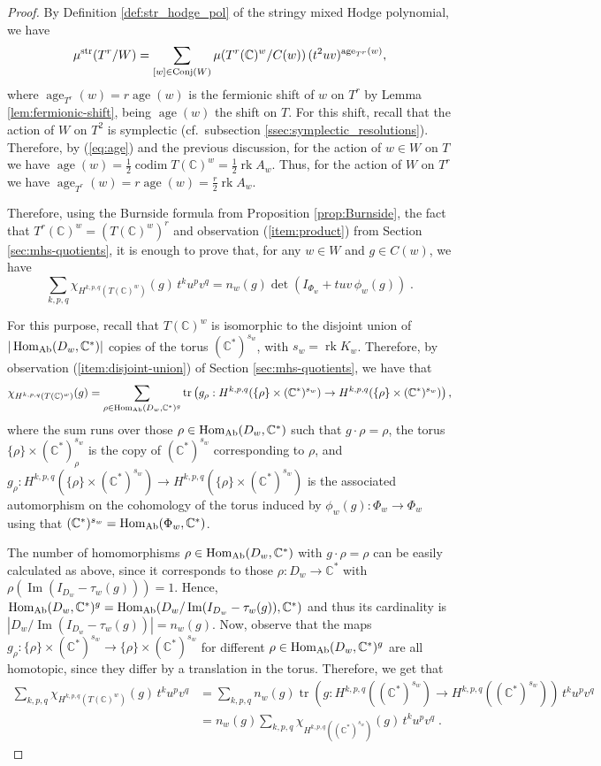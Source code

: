 \documentclass[11pt,english]{amsart}
\numberwithin{equation}{section}
\numberwithin{figure}{section}
\theoremstyle{plain}
\theoremstyle{plain}
\theoremstyle{definition}
\theoremstyle{remark}
\DeclareMathOperator{\image}{Im}
\newcommand{\CC}{\mathbb{C}}
\newcommand{\codim}{\operatorname{codim}}
\newcommand{\Hom}{\operatorname{Hom}}
\newcommand{\rk}{\operatorname{rk}}
\newcommand{\tr}{\operatorname{tr}}
\newcommand{\age}{\operatorname{age}}
\newcommand{\str}{\textup{str}}
\newcommand{\Ab}{\textup{Ab}}
\begin{document}
\begin{proof}
    By Definition \ref{def:str_hodge_pol} of the stringy mixed Hodge polynomial, we have
$$
    \mu^{\str}(T^r/W) = \sum_{[w] \in \text{Conj}(W)} \mu(T^r(\CC)^w / C(w))\, (t^{2}uv)^{\age_{T^r}(w)},
$$
where $\age_{T^r}(w) = r \age(w)$ is the fermionic shift of $w$ on $T^r$ by Lemma \ref{lem:fermionic-shift}, being $\age(w)$ the shift on $T$. For this shift, recall that the action of $W$ on $T^2$ is symplectic (cf.\ subsection \ref{ssec:symplectic_resolutions}). Therefore, by (\ref{eq:age}) and the previous discussion, for the action of $w \in W$ on $T$ we have $\age(w) = \frac{1}{2}\codim T(\CC)^w = \frac{1}{2}\rk A_w$. Thus, for the action of $W$ on $T^r$ we have $\age_{T^r}(w) = r \age(w) = \frac{r}{2}\rk A_w$.

Therefore, using the Burnside formula from Proposition \ref{prop:Burnside}, the fact that $T^r(\CC)^w = (T(\CC)^w)^r$ and observation (\ref{item:product}) from Section \ref{sec:mhs-quotients}, it is enough to prove that, for any $w \in W$ and $g \in C(w)$, we have
$$
    \sum_{k,p,q} \chi_{H^{k,p,q}(T(\CC)^w)}(g) \,t^ku^pv^q = n_{w}(g) \det\left(I_{\Phi_w} + tuv\,\phi_w(g)\right)\; .
$$

For this purpose, recall that $T(\CC)^w$ is isomorphic to the disjoint union of $|\Hom_{\Ab}(D_w, \CC^*)|$ copies of the torus $(\CC^*)^{s_w}$, with $s_w= \rk K_w$. Therefore, by observation (\ref{item:disjoint-union}) of Section \ref{sec:mhs-quotients}, we have that
$$
\chi_{H^{k,p,q}(T(\CC)^w)}(g) = \sum_{\rho \in \Hom_{\Ab}(D_w, \CC^*)^g} \tr\left(g_{\rho}: H^{k,p,q}(\{\rho\} \times (\CC^*)^{s_w}) \to H^{k,p,q}(\{\rho\} \times (\CC^*)^{s_w})\right),
$$
where the sum runs over those $\rho \in \Hom_{\Ab}(D_w, \CC^*)$ such that $g \cdot \rho = \rho$, the torus $\{\rho\} \times (\CC^*)^{s_w}_\rho$ is the copy of $(\CC^*)^{s_w}$ corresponding to $\rho$, and
$g_{\rho}: H^{k,p,q}(\{\rho\} \times (\CC^*)^{s_w})\to H^{k,p,q}(\{\rho\} \times (\CC^*)^{s_w})$ is the associated automorphism on the cohomology of the torus induced by $\phi_w(g): \Phi_w \to \Phi_w$ using that $(\CC^*)^{s_w} = \Hom_{\Ab}(\Phi_w, \CC^*)$.

The number of homomorphisms $\rho \in \Hom_{\Ab}(D_w, \CC^*)$ with $g \cdot \rho = \rho$ can be easily calculated as above, since it corresponds to those $\rho: D_w \to \CC^*$ with $\rho(\image(I_{D_w} - \tau_w(g))) = 1$. Hence, $\Hom_{\Ab}(D_w, \CC^*)^g = \Hom_{\Ab}(D_w/ \image(I_{D_w} - \tau_w(g)), \CC^*)$ and thus its cardinality is $|D_w/ \image(I_{D_w} - \tau_w(g))| = n_w(g)$. Now, observe that the maps $g_\rho: \{\rho\} \times (\CC^*)^{s_w} \to \{\rho\} \times (\CC^*)^{s_w}$ for different $\rho \in \Hom_{\Ab}(D_w, \CC^*)^g$ are all homotopic, since they differ by a translation in the torus. Therefore, we get that
\begin{align*}
\sum_{k,p,q} \chi_{H^{k,p,q}(T(\CC)^w)}(g) \,t^ku^pv^q & = \sum_{k,p,q}  n_w(g) \tr\left(g: H^{k,p,q}((\CC^*)^{s_w}) \to H^{k,p,q}((\CC^*)^{s_w})\right) \,t^ku^pv^q \\
& = n_w(g) \sum_{k,p,q} \chi_{H^{k,p,q}((\CC^*)^{s_w})}(g)\,t^ku^pv^q\; .
\end{align*}


\end{proof}
\end{document}
